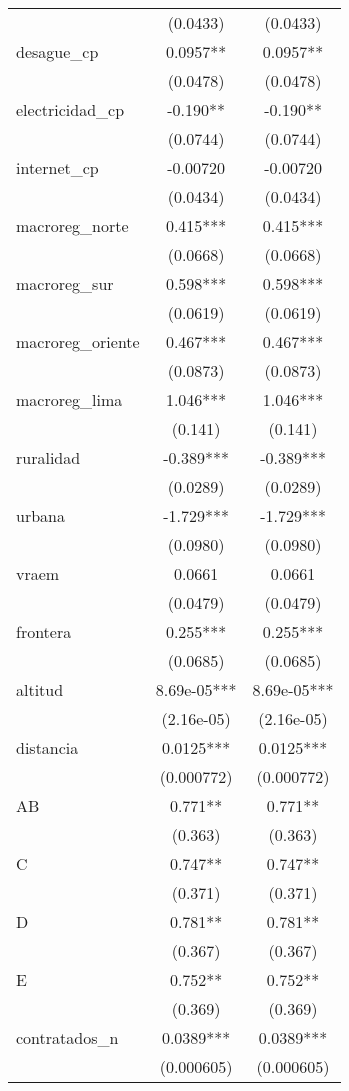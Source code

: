 \documentclass[]{article}
\begin{document}
\begin{tabular}{lcc}
 & (0.0433) & (0.0433) \\
desague\_cp & 0.0957** & 0.0957** \\
 & (0.0478) & (0.0478) \\
electricidad\_cp & -0.190** & -0.190** \\
 & (0.0744) & (0.0744) \\
internet\_cp & -0.00720 & -0.00720 \\
 & (0.0434) & (0.0434) \\
macroreg\_norte & 0.415*** & 0.415*** \\
 & (0.0668) & (0.0668) \\
macroreg\_sur & 0.598*** & 0.598*** \\
 & (0.0619) & (0.0619) \\
macroreg\_oriente & 0.467*** & 0.467*** \\
 & (0.0873) & (0.0873) \\
macroreg\_lima & 1.046*** & 1.046*** \\
 & (0.141) & (0.141) \\
ruralidad & -0.389*** & -0.389*** \\
 & (0.0289) & (0.0289) \\
urbana & -1.729*** & -1.729*** \\
 & (0.0980) & (0.0980) \\
vraem & 0.0661 & 0.0661 \\
 & (0.0479) & (0.0479) \\
frontera & 0.255*** & 0.255*** \\
 & (0.0685) & (0.0685) \\
altitud & 8.69e-05*** & 8.69e-05*** \\
 & (2.16e-05) & (2.16e-05) \\
distancia & 0.0125*** & 0.0125*** \\
 & (0.000772) & (0.000772) \\
AB & 0.771** & 0.771** \\
 & (0.363) & (0.363) \\
C & 0.747** & 0.747** \\
 & (0.371) & (0.371) \\
D & 0.781** & 0.781** \\
 & (0.367) & (0.367) \\
E & 0.752** & 0.752** \\
 & (0.369) & (0.369) \\
contratados\_n & 0.0389*** & 0.0389*** \\
 & (0.000605) & (0.000605) \\

\end{tabular}
\end{document}

